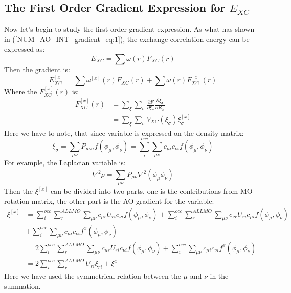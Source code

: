 \subsection{The First Order Gradient Expression for $E_{XC}$}
\label{1st_XC_general_derivative}
%
%
%
%
Now let's begin to study the first order gradient expression. As what has shown
in (\ref{NUM_AO_INT_gradient_eq:1}), the exchange-correlation energy can be
expressed as:
\begin{equation}
\label{NUM_AO_INT_gradient_1st_eq:1}
E_{XC} = \sum\omega(r)F_{XC}(r) 
\end{equation}
Then the gradient is:
\begin{equation}
  E_{XC}^{[x]} =  \sum\omega^{[x]}(r)F_{XC}(r) +
\sum\omega(r)F^{[x]}_{XC}(r) 
\label{NUM_AO_INT_gradient_1st_eq:2}
\end{equation}
Where the $F^{[x]}_{XC}(r)$ is:
\begin{align}
F^{[x]}_{XC}(r) &= \sum_{\xi}\sum_{\sigma}\frac{\partial F}{\partial
\xi_{\sigma}} \frac{\partial \xi_{\sigma}}{\partial \bm{R}_{x}} \nonumber\\
&=  \sum_{\xi}\sum_{\sigma} V_{XC}(\xi_{\sigma})\xi_{\sigma}^{[x]}
 \label{NUM_AO_INT_gradient_1st_eq:3}
\end{align}
Here we have to note, that since variable is expressed on the density matrix:
\begin{equation}
 \xi_{\sigma} = \sum_{\mu\nu}P_{\mu\nu\sigma}f(\phi_{\mu}, \phi_{\nu}) = 
\sum_{i}^{occ}\sum_{\mu\nu}c_{\mu i}c_{\nu i}f(\phi_{\mu}, \phi_{\nu})
\end{equation}
For example, the Laplacian variable is:
\begin{equation}
 \nabla^{2}\rho = \sum_{\mu\nu}P_{\mu\nu}\nabla^{2}(\phi_{\mu}\phi_{\nu})
\end{equation}
Then the $\xi^{[x]}$ can be divided into two parts, one is the contributions
from MO rotation matrix, the other part is the AO gradient for the variable:
\begin{align}
\label{NUM_AO_INT_gradient_1st_eq:4}
 \xi^{[x]}  &=  \sum_{i}^{occ}\sum_{r}^{ALL MO}\sum_{\mu\nu}c_{\mu
r}U_{ri}c_{\nu i}f(\phi_{\mu}, \phi_{\nu}) 
+   \sum_{i}^{occ}\sum_{r}^{ALL MO}\sum_{\mu\nu}c_{\nu
r}U_{ri}c_{\mu i}f(\phi_{\mu}, \phi_{\nu}) \nonumber \\
&+ \sum_{i}^{occ}\sum_{\mu\nu}c_{\mu i}c_{\nu i}f^{x}(\phi_{\mu}, \phi_{\nu})
\nonumber \\
&= 2\sum_{i}^{occ}\sum_{r}^{ALL MO}\sum_{\mu\nu}c_{\mu
r}U_{ri}c_{\nu i}f(\phi_{\mu}, \phi_{\nu}) +
 \sum_{i}^{occ}\sum_{\mu\nu}c_{\mu i}c_{\nu i}f^{x}(\phi_{\mu}, \phi_{\nu})
\nonumber \\
&= 2\sum_{i}^{occ}\sum_{r}^{ALL MO}U_{ri}\xi_{ri} + \xi^{x}  
\end{align}
Here we have used the symmetrical relation between the $\mu$ and $\nu$ in the
summation.


